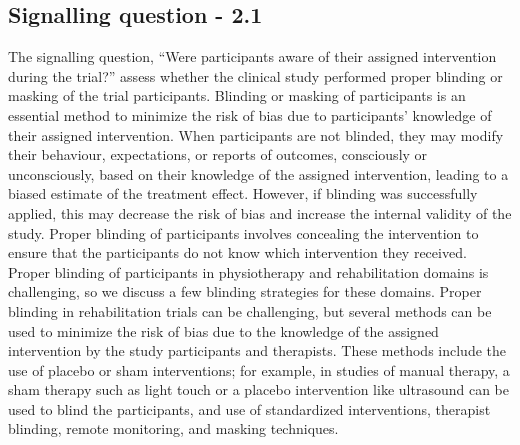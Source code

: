 \documentclass[sn-mathphys,Numbered]{sn-jnl}%
\begin{document}
\subsection*{Signalling question - 2.1}
\label{subsec:2_1}
%
The signalling question, ``Were participants aware of their assigned intervention during the trial?'' assess whether the clinical study performed proper blinding or masking of the trial participants.
Blinding or masking of participants is an essential method to minimize the risk of bias due to participants' knowledge of their assigned intervention.
When participants are not blinded, they may modify their behaviour, expectations, or reports of outcomes, consciously or unconsciously, based on their knowledge of the assigned intervention, leading to a biased estimate of the treatment effect.
However, if blinding was successfully applied, this may decrease the risk of bias and increase the internal validity of the study.
Proper blinding of participants involves concealing the intervention to ensure that the participants do not know which intervention they received.
Proper blinding of participants in physiotherapy and rehabilitation domains is challenging, so we discuss a few blinding strategies for these domains. 
Proper blinding in rehabilitation trials can be challenging, but several methods can be used to minimize the risk of bias due to the knowledge of the assigned intervention by the study participants and therapists. These methods include the use of placebo or sham interventions; for example, in studies of manual therapy, a sham therapy such as light touch or a placebo intervention like ultrasound can be used to blind the participants, and use of standardized interventions, therapist blinding, remote monitoring, and masking techniques.
\end{document}
